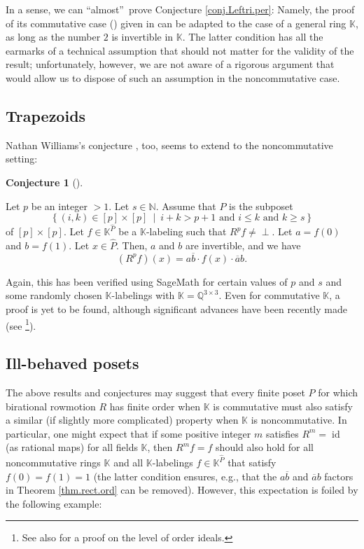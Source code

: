 \documentclass[numbers=enddot,12pt,final,onecolumn,notitlepage]{scrartcl}%
\theoremstyle{definition}
\newtheorem{conj}[theo]{Conjecture}
\newenvironment{conjecture}[1][]
{\begin{conj}[#1]\begin{leftbar}}
{\end{leftbar}\end{conj}}
\newcommand{\undf}{\operatorname*{\bot}}
\begin{document}
In a sense, we can \textquotedblleft almost\textquotedblright\ prove
Conjecture \ref{conj.Leftri.per}: Namely, the proof of its commutative case
(\cite[Theorem 58]{bir-row-2}) given in \cite{bir-row-2} can be adapted to the
case of a general ring $\mathbb{K}$, as long as the number $2$ is invertible
in $\mathbb{K}$. The latter condition has all the earmarks of a technical
assumption that should not matter for the validity of the result;
unfortunately, however, we are not aware of a rigorous argument that would
allow us to dispose of such an assumption in the noncommutative case.

\subsection{Trapezoids}

Nathan Williams's conjecture \cite[Conjecture 75]{bir-row-2}, too, seems to
extend to the noncommutative setting:

\begin{conjecture}
[periodicity conjecture for the trapezoid]\label{conj.trapezoid.per}Let $p$ be
an integer $>1$. Let $s\in\mathbb{N}$. Assume that $P$ is the subposet
\[
\left\{  \left(  i,k\right)  \in\left[  p\right]  \times\left[  p\right]
\ \mid\ i+k>p+1\text{ and }i\leq k\text{ and }k\geq s\right\}
\]
of $\left[  p\right]  \times\left[  p\right]  $. Let $f\in\mathbb{K}%
^{\widehat{P}}$ be a $\mathbb{K}$-labeling such that $R^{p}f\neq\undf$. Let
$a=f\left(  0\right)  $ and $b=f\left(  1\right)  $. Let $x\in\widehat{P}$.
Then, $a$ and $b$ are invertible, and we have%
\[
\left(  R^{p}f\right)  \left(  x\right)  =a\overline{b}\cdot f\left(
x\right)  \cdot\overline{a}b.
\]

\end{conjecture}

Again, this has been verified using SageMath for certain values of $p$ and $s$
and some randomly chosen $\mathbb{K}$-labelings with $\mathbb{K}%
=\mathbb{Q}^{3\times3}$. Even for commutative $\mathbb{K}$, a proof is yet to
be found, although significant advances have been recently made (see
\cite[Chapter 4]{Johnso23}\footnote{See also \cite{DWYWZ20} for a proof on the
level of order ideals.}).

\subsection{Ill-behaved posets}

The above results and conjectures may suggest that every finite poset $P$ for
which birational rowmotion $R$ has finite order when $\mathbb{K}$ is
commutative must also satisfy a similar (if slightly more complicated)
property when $\mathbb{K}$ is noncommutative. In particular, one might expect
that if some positive integer $m$ satisfies $R^{m}=\operatorname*{id}$ (as
rational maps) for all fields $\mathbb{K}$, then $R^{m}f=f$ should also hold
for all noncommutative rings $\mathbb{K}$ and all $\mathbb{K}$-labelings
$f\in\mathbb{K}^{\widehat{P}}$ that satisfy $f\left(  0\right)  =f\left(
1\right)  =1$ (the latter condition ensures, e.g., that the $a\overline{b}$
and $\overline{a}b$ factors in Theorem \ref{thm.rect.ord} can be removed).
However, this expectation is foiled by the following example:
\end{document}
